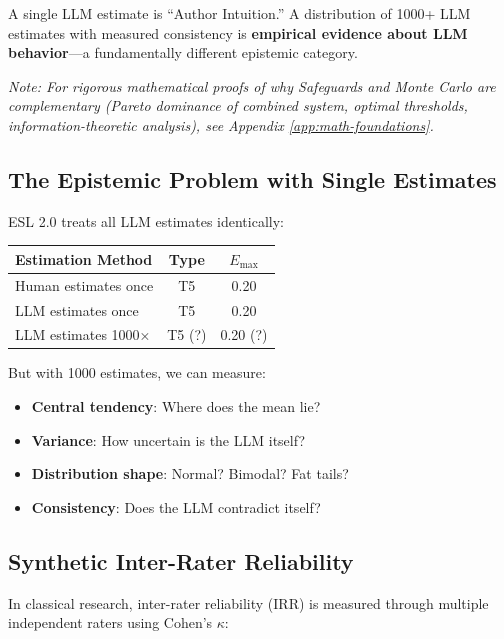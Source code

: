 \documentclass[11pt,a4paper]{article}
\begin{document}
\begin{principle}
\label{princ:mc}
A single LLM estimate is ``Author Intuition.'' A distribution of 1000+ LLM estimates with measured consistency is \textbf{empirical evidence about LLM behavior}---a fundamentally different epistemic category.
\end{principle}

\noindent\textit{Note: For rigorous mathematical proofs of why Safeguards and Monte Carlo are complementary (Pareto dominance of combined system, optimal thresholds, information-theoretic analysis), see Appendix \ref{app:math-foundations}.}

\subsection{The Epistemic Problem with Single Estimates}

ESL 2.0 treats all LLM estimates identically:

\begin{center}
\begin{tabular}{lcc}
\toprule
\textbf{Estimation Method} & \textbf{Type} & \textbf{$E_{\max}$} \\
\midrule
Human estimates once & T5 & 0.20 \\
LLM estimates once & T5 & 0.20 \\
LLM estimates 1000× & T5 (?) & 0.20 (?) \\
\bottomrule
\end{tabular}
\end{center}

But with 1000 estimates, we can measure:
\begin{itemize}
    \item \textbf{Central tendency}: Where does the mean lie?
    \item \textbf{Variance}: How uncertain is the LLM itself?
    \item \textbf{Distribution shape}: Normal? Bimodal? Fat tails?
    \item \textbf{Consistency}: Does the LLM contradict itself?
\end{itemize}

\subsection{Synthetic Inter-Rater Reliability}

In classical research, inter-rater reliability (IRR) is measured through multiple independent raters using Cohen's $\kappa$:
\end{document}
